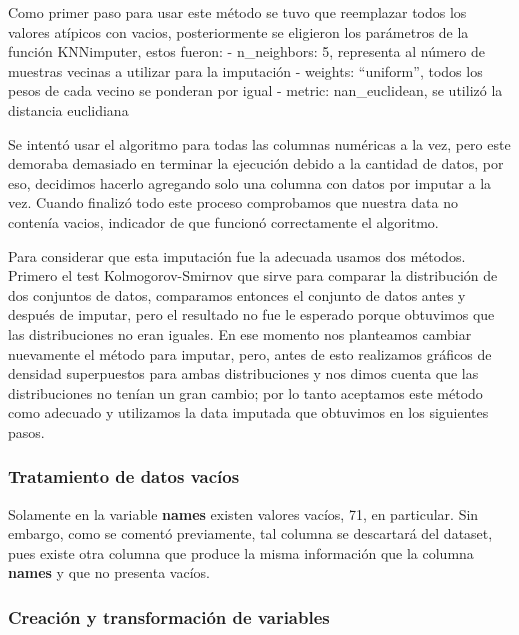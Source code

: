 \documentclass[
  letterpaper,
  DIV=11,
  numbers=noendperiod]{scrartcl}
\begin{document}
Como primer paso para usar este método se tuvo que reemplazar todos los
valores atípicos con vacios, posteriormente se eligieron los parámetros
de la función KNNimputer, estos fueron: - n\_neighbors: 5, representa al
número de muestras vecinas a utilizar para la imputación - weights:
``uniform'', todos los pesos de cada vecino se ponderan por igual -
metric: nan\_euclidean, se utilizó la distancia euclidiana

Se intentó usar el algoritmo para todas las columnas numéricas a la vez,
pero este demoraba demasiado en terminar la ejecución debido a la
cantidad de datos, por eso, decidimos hacerlo agregando solo una columna
con datos por imputar a la vez. Cuando finalizó todo este proceso
comprobamos que nuestra data no contenía vacios, indicador de que
funcionó correctamente el algoritmo.

Para considerar que esta imputación fue la adecuada usamos dos métodos.
Primero el test Kolmogorov-Smirnov que sirve para comparar la
distribución de dos conjuntos de datos, comparamos entonces el conjunto
de datos antes y después de imputar, pero el resultado no fue le
esperado porque obtuvimos que las distribuciones no eran iguales. En ese
momento nos planteamos cambiar nuevamente el método para imputar, pero,
antes de esto realizamos gráficos de densidad superpuestos para ambas
distribuciones y nos dimos cuenta que las distribuciones no tenían un
gran cambio; por lo tanto aceptamos este método como adecuado y
utilizamos la data imputada que obtuvimos en los siguientes pasos.

\hypertarget{tratamiento-de-datos-vacuxedos}{%
\subsubsection{Tratamiento de datos
vacíos}\label{tratamiento-de-datos-vacuxedos}}

Solamente en la variable \textbf{names} existen valores vacíos, 71, en
particular. Sin embargo, como se comentó previamente, tal columna se
descartará del dataset, pues existe otra columna que produce la misma
información que la columna \textbf{names} y que no presenta vacíos.

\hypertarget{creaciuxf3n-y-transformaciuxf3n-de-variables}{%
\subsubsection{Creación y transformación de
variables}\label{creaciuxf3n-y-transformaciuxf3n-de-variables}}
\end{document}

